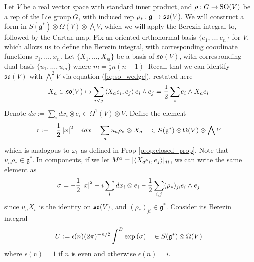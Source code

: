 Let $V$ be a real vector space with standard inner product, and $\rho : G \to
\operatorname{SO}(V)$ be a rep of the Lie group $G$, with induced rep $\rho_* :
\mathfrak{g}\to \operatorname{\mathfrak{so}}(V)$.
We will construct a form in $S(\mathfrak{g}^*)\otimes \Omega(V) \otimes
\bigwedge V$, which we will apply the Berezin integral to, followed by the
Cartan map.  Fix an oriented orthonormal basis $\{e_1,\ldots,e_n\}$ for
$V$, which allows us to define the Berezin integral, with corresponding
coordinate functions $x_1,\ldots,x_n$.   
Let  $\{X_1,\ldots,X_m\}$ be a basis of $\mathfrak{so}(V)$, with corresponding
dual basis $\{u_1,\ldots,u_m\}$ where $m= \frac{1}{2}n(n-1)$. Recall that we 
can identify $\mathfrak{so}(V)$ with 
$\bigwedge^2 V$ via equation (\ref{eq:so_wedge}), restated here 
\[
	X_a \in\mathfrak{so}(V) \mapsto \sum_{i<j}\gen{X_a e_i,e_j} e_i\wedge e_j
	= \frac{1}{2}\sum_{i} e_i\wedge X_a e_i
\] 
Denote $dx := \sum_i dx_i \otimes e_i \in \Omega^1(V)\otimes V$. Define the element 
\begin{equation} %
	\label{eq:universal_thom_exponent}
	\sigma := -\frac{1}{2}\abs{x}^2 - idx 
	- \sum_a u_a\rho_* \otimes X_a 
	\quad \in S(\g^*) \otimes \Omega(V) \otimes \bigwedge V
\end{equation}
which is analogous to $\omega_1$ as defined in Prop \ref{prop:closed_prop}.
Note that $u_a \rho_* \in \mathfrak{g}^*$.
In components, if we let $M^a = [\gen{ X_ae_i,e_j}]_{ji}$, we can write the same
element as 
\begin{equation} \label{eq:universal_thom_exponent2}
\sigma = -\frac{1}{2}\abs{x}^2 - i\sum_i dx_i\otimes e_i 
	-\frac{1}{2} \sum_{i,j} (\rho_*)_{ji}e_i\wedge e_j
\end{equation}
since $u_aX_a$ is the identity on  $\operatorname{\mathfrak{so}}(V)$, and $(\rho_*)_{ji} \in \mathfrak{g}^*$.
Consider its Berezin integral
\begin{equation} \label{eq:universal_thom}
	U := \epsilon(n)(2\pi)^{-n /2}\int^B \exp\paren{\sigma}  
	\quad\in S(\g^*)\otimes \Omega(V)
\end{equation}
where $\epsilon(n)=1$ if $n$ is even and otherwise $\epsilon(n)=i$.

